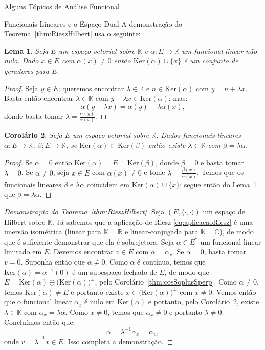 \documentclass[oneside,final,11pt]{amsbook}
\newcommand{\R}{\mathds R}
\newcommand{\C}{\mathds C}
\newcommand{\K}{\mathds K}
\newcommand{\Ker}{\mathrm{Ker}}
\theoremstyle{remark}\newtheorem{exercise}{Exercício}[chapter]
\theoremstyle{remark}\newtheorem{*exercise}[exercise]{\hbox to 0pt{\hskip 0pt minus 1fil*}Exercício}
\theoremstyle{definition}\newtheorem{exdefin}{Definição}[chapter]
\theoremstyle{plain}\newtheorem{teo}{Teorema}[section]
\theoremstyle{plain}\newtheorem{lem}[teo]{Lema}
\theoremstyle{plain}\newtheorem{prop}[teo]{Proposição}
\theoremstyle{plain}\newtheorem{cor}[teo]{Corolário}
\theoremstyle{definition}\newtheorem{defin}[teo]{Definição}
\theoremstyle{remark}\newtheorem{rem}[teo]{Observação}
\theoremstyle{definition}\newtheorem{notation}[teo]{Notação}
\theoremstyle{definition}\newtheorem{convention}[teo]{Convenção}
\theoremstyle{definition}\newtheorem{example}[teo]{Exemplo}
\numberwithin{section}{chapter}
\numberwithin{equation}{section}
\begin{document}
\begin{chapter}{Alguns Tópicos de Análise Funcional}
\begin{section}{Funcionais Lineares e o Espaço Dual}
A demonstração do Teorema~\ref{thm:RieszHilbert} usa o seguinte:
\begin{lem}\label{thm:lemaKeralphacodim1}
Seja $E$ um espaço vetorial sobre $\K$ e $\alpha:E\to\K$ um funcional linear não nulo. Dado $x\in E$
com $\alpha(x)\ne0$ então $\Ker(\alpha)\cup\{x\}$ é um conjunto de geradores para $E$.
\end{lem}
\begin{proof}
Seja $y\in E$; queremos encontrar $\lambda\in\K$ e $n\in\Ker(\alpha)$ com $y=n+\lambda x$. Basta então encontrar
$\lambda\in\K$ com $y-\lambda x\in\Ker(\alpha)$; mas:
\[\alpha(y-\lambda x)=\alpha(y)-\lambda\alpha(x),\]
donde basta tomar $\lambda=\frac{\alpha(y)}{\alpha(x)}$.
\end{proof}

\begin{cor}\label{thm:coralphaldbeta}
Seja $E$ um espaço vetorial sobre $\K$. Dados funcionais lineares $\alpha:E\to\K$, $\beta:E\to\K$, se
$\Ker(\alpha)\subset\Ker(\beta)$ então existe $\lambda\in\K$ com $\beta=\lambda\alpha$.
\end{cor}
\begin{proof}
Se $\alpha=0$ então $\Ker(\alpha)=E=\Ker(\beta)$, donde $\beta=0$ e basta tomar $\lambda=0$. Se $\alpha\ne0$,
seja $x\in E$ com $\alpha(x)\ne0$ e tome $\lambda=\frac{\beta(x)}{\alpha(x)}$. Temos que os funcionais lineares
$\beta$ e $\lambda\alpha$ coincidem em $\Ker(\alpha)\cup\{x\}$; segue então do Lema~\ref{thm:lemaKeralphacodim1} que
$\beta=\lambda\alpha$.
\end{proof}

\begin{proof}[Demonstração do Teorema~\ref{thm:RieszHilbert}]
Seja $(E,\langle\cdot,\cdot\rangle)$ um espaço de Hilbert sobre $\K$. Já sabemos que a aplicação de Riesz
\eqref{eq:aplicacaoRiesz} é uma imersão isométrica (linear para $\K=\R$ e linear-conjugada para $\K=\C$), de modo que é suficiente
demonstrar que ela é sobrejetora. Seja $\alpha\in E^*$ um funcional linear limitado em $E$. Devemos encontrar
$v\in E$ com $\alpha=\alpha_v$. Se $\alpha=0$, basta tomar $v=0$. Suponha então que $\alpha\ne0$. Como
$\alpha$ é contínuo, temos que $\Ker(\alpha)=\alpha^{-1}(0)$ é um subespaço fechado de $E$, de modo que
$E=\Ker(\alpha)\oplus\big(\Ker(\alpha)\big)^\perp$, pelo Corolário~\ref{thm:cosSoplusSperp}.
Como $\alpha\ne0$, temos $\Ker(\alpha)\ne E$ e portanto existe $x\in\big(\Ker(\alpha)\big)^\perp$
com $x\ne0$. Vemos então que o funcional linear $\alpha_x$ é nulo em $\Ker(\alpha)$ e portanto,
pelo Corolário~\ref{thm:coralphaldbeta}, existe $\lambda\in\K$ com $\alpha_x=\lambda\alpha$.
Como $x\ne0$, temos que $\alpha_x\ne0$ e portanto $\lambda\ne0$. Concluímos então que:
\[\alpha=\lambda^{-1}\alpha_x=\alpha_v,\]
onde $v=\bar\lambda^{-1}x\in E$. Isso completa a demonstração.
\end{proof}


\end{section}
\end{chapter}
\end{document}
